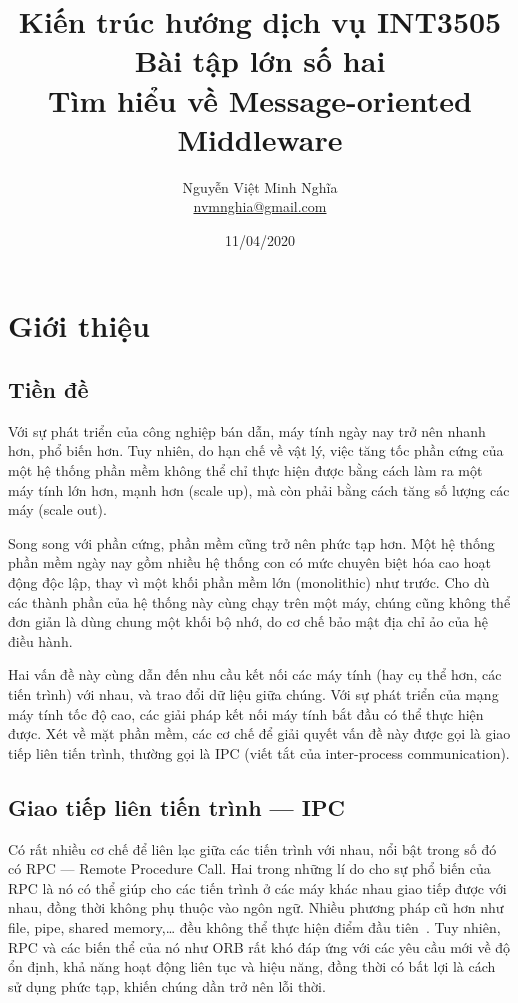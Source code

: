 \documentclass{article}
\author{Nguyễn Việt Minh Nghĩa \\ \href{mailto:nvmnghia@gmail.com}{nvmnghia@gmail.com}}
\date{11/04/2020}
\title{Kiến trúc hướng dịch vụ INT3505 \\ Bài tập lớn số hai \\ Tìm hiểu về Message-oriented Middleware}
\begin{document}
\maketitle

\section{Giới thiệu}

\subsection{Tiền đề}

Với sự phát triển của công nghiệp bán dẫn, máy tính ngày nay trở nên nhanh hơn,
phổ biến hơn. Tuy nhiên, do hạn chế về vật lý, việc tăng tốc phần cứng của một
hệ thống phần mềm không thể chỉ thực hiện được bằng cách làm ra một máy tính lớn
hơn, mạnh hơn (scale up), mà còn phải bằng cách tăng số lượng các máy (scale
out).

Song song với phần cứng, phần mềm cũng trở nên phức tạp hơn. Một hệ thống phần
mềm ngày nay gồm nhiều hệ thống con có mức chuyên biệt hóa cao hoạt động độc
lập, thay vì một khối phần mềm lớn (monolithic) như trước. Cho dù các thành phần
của hệ thống này cùng chạy trên một máy, chúng cũng không thể đơn giản là dùng
chung một khối bộ nhớ, do cơ chế bảo mật địa chỉ ảo của hệ điều hành.

Hai vấn đề này cùng dẫn đến nhu cầu kết nối các máy tính (hay cụ thể hơn, các
tiến trình) với nhau, và trao đổi dữ liệu giữa chúng. Với sự phát triển của mạng
máy tính tốc độ cao, các giải pháp kết nối máy tính bắt đầu có thể thực hiện
được. Xét về mặt phần mềm, các cơ chế để giải quyết vấn đề này được gọi là giao
tiếp liên tiến trình, thường gọi là IPC (viết tắt của inter-process
communication).

\subsection{Giao tiếp liên tiến trình --- IPC}

Có rất nhiều cơ chế để liên lạc giữa các tiến trình với nhau, nổi bật trong số
đó có RPC --- Remote Procedure Call. Hai trong những lí do cho sự phổ biến của
RPC là nó có thể giúp cho các tiến trình ở các máy khác nhau giao tiếp được với
nhau, đồng thời không phụ thuộc vào ngôn ngữ. Nhiều phương pháp cũ hơn như file,
pipe, shared memory,\ldots{} đều không thể thực hiện điểm đầu tiên~\cite{osc12}.
Tuy nhiên, RPC và các biến thể của nó như ORB rất khó đáp ứng với các yêu cầu
mới về độ ổn định, khả năng hoạt động liên tục và hiệu năng, đồng thời có bất
lợi là cách sử dụng phức tạp, khiến chúng dần trở nên lỗi thời.
\end{document}
